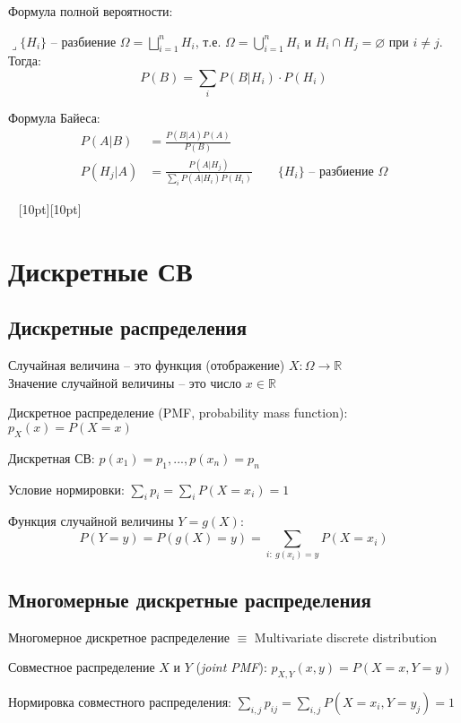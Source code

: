 \documentclass[a4paper,12pt,fleqn]{article}
\numberwithin{figure}{section}
\theoremstyle{definition}
\def\R{\mathbb{R}}
\def\on{\!:}
\def\lets{{\huge$\lrcorner$}\space}
\def\vignette{\vspace{48pt} \noindent \hrulefill~
	          \raisebox{-8pt}[10pt][10pt]{\Huge\ding{102}}
	          ~\hrulefill}
\begin{document}
Формула полной вероятности:

\lets $\{H_i\}$ -- разбиение $\Omega = \bigsqcup_{i=1}^n H_i$, т.е.
$\Omega = \bigcup_{i=1}^n H_i$ и $H_i \cap H_j = \varnothing$ при $i \ne j$.
Тогда:
\[ P(B) = \sum_i P(B|H_i) \cdot P(H_i)  \]

Формула Байеса:
\begin{align*}
P(A|B) &= \frac{P(B|A) P(A)}{P(B)} \\
P(H_j|A) &= \frac{P(A|H_j)}{\sum_i P(A|H_i) P(H_i)}
			\qquad \{H_i\} \text{ -- разбиение } \Omega
\end{align*}


\vignette
\section{Дискретные СВ}

\subsection{Дискретные распределения}

Случайная величина -- это функция (отображение) $X\on \Omega\to\R$ \\
Значение случайной величины -- это число $x\in\R$

Дискретное распределение (PMF, probability mass function): $p_X(x)=P(X=x)$

Дискретная СВ: $p(x_1)=p_1, ..., p(x_n)=p_n$

Условие нормировки: $\sum_i p_i = \sum_i P(X=x_i)=1$

Функция случайной величины $Y=g(X)$:
\[ P(Y=y) = P(g(X)=y) = \sum_{i:\: g(x_i)=y}P(X=x_i) \]


\subsection{Многомерные дискретные распределения}

Многомерное дискретное распределение $\equiv$ Multivariate discrete distribution

Совместное распределение $X$ и $Y$ (\textit{joint PMF}): $p_{X,Y}(x,y)=P(X=x,Y=y)$

Нормировка совместного распределения:
$\sum_{i,j}p_{ij} = \sum_{i,j} P(X=x_i,Y=y_j) = 1$
\end{document}
